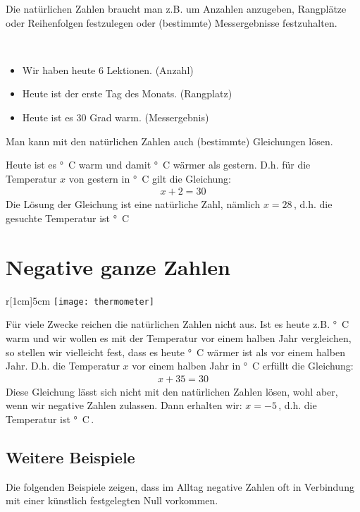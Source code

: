 \vspace{.5cm}
Die natürlichen Zahlen braucht man z.B. um Anzahlen anzugeben, Rangplätze oder Reihenfolgen festzulegen oder (bestimmte) Messergebnisse festzuhalten.

\begin{example}~
	\begin{itemize}\setlength\itemsep{0pt}
		\item Wir haben heute 6 Lektionen. (Anzahl)
		\item Heute ist der erste Tag des Monats. (Rangplatz)
		\item Heute ist es 30 Grad warm. (Messergebnis)
	\end{itemize}
\end{example}

Man kann mit den natürlichen Zahlen auch (bestimmte) Gleichungen lösen.
\begin{example}
 Heute ist es \unit[30]{°C} warm und damit \unit[2]{°C} wärmer als gestern.
 D.h. für die Temperatur $x$ von gestern in \unit{°C} gilt die Gleichung:
 \begin{align*}
   x + 2 = 30
 \end{align*}
Die Lösung der Gleichung ist eine natürliche Zahl, nämlich $x = 28$\,, d.h. die gesuchte Temperatur ist \unit[28]{°C}
\end{example}


\section{Negative ganze Zahlen}
\begin{wrapfigure}{r}[1cm]{5cm}
 \texttt{[image: thermometer]}
\end{wrapfigure}
Für viele Zwecke reichen die natürlichen Zahlen nicht aus.
Ist es heute z.B. \unit[30]{°C} warm und wir wollen es mit der Temperatur vor einem halben Jahr vergleichen, so stellen wir vielleicht fest, dass es heute \unit[35]{°C} wärmer ist als vor einem halben Jahr.
D.h. die Temperatur $x$ vor einem halben Jahr in \unit{°C} erfüllt die Gleichung:
\begin{align*}
	x + 35 = 30
\end{align*}
Diese Gleichung lässt sich nicht mit den natürlichen Zahlen lösen, wohl aber, wenn wir negative Zahlen zulassen.
Dann erhalten wir: $x = -5$\,, d.h. die Temperatur ist \unit[--5]{°C}\,.

\subsection{Weitere Beispiele}
Die folgenden Beispiele zeigen, dass im Alltag negative Zahlen oft in Verbindung mit einer künstlich festgelegten Null vorkommen.

